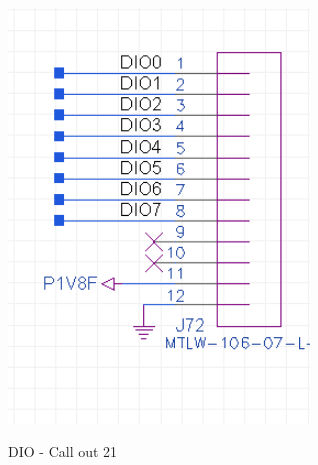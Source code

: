 		\begin{figure}[htbp!]
			\centering
			\includegraphics[width=8cm]{img/io.png}\\
			\caption{DIO - Call out 21} \label{ios}
		\end{figure}
%
%		

\clearpage


%	


